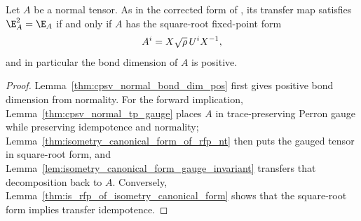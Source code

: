 \begin{lemma}%
    \label{thm:normal_rfp_iff_isometry_canonical_form}
    \leanok
    Let $A$ be a normal tensor. As in the corrected form of
    \cite[Lemma~B.1, lines~1274--1301]{Cirac2016MPDO_arXiv}, its transfer map
    satisfies $\E_A^2 = \E_A$ if and only if $A$ has the square-root
    fixed-point form
    \begin{align}
        A^i = X\sqrt\rho\, U^i X^{-1},
        \notag
    \end{align}
    and in particular the bond dimension of $A$ is positive.
\end{lemma}
\begin{proof}\leanok
    Lemma~\ref{thm:cpsv_normal_bond_dim_pos} first gives positive bond
    dimension from normality. For the forward implication,
    Lemma~\ref{thm:cpsv_normal_tp_gauge} places $A$ in trace-preserving
    Perron gauge while preserving idempotence and normality;
    Lemma~\ref{thm:isometry_canonical_form_of_rfp_nt} then puts the gauged
    tensor in square-root form, and
    Lemma~\ref{lem:isometry_canonical_form_gauge_invariant} transfers that
    decomposition back to $A$. Conversely,
    Lemma~\ref{thm:is_rfp_of_isometry_canonical_form} shows that the
    square-root form implies transfer idempotence.
\end{proof}

